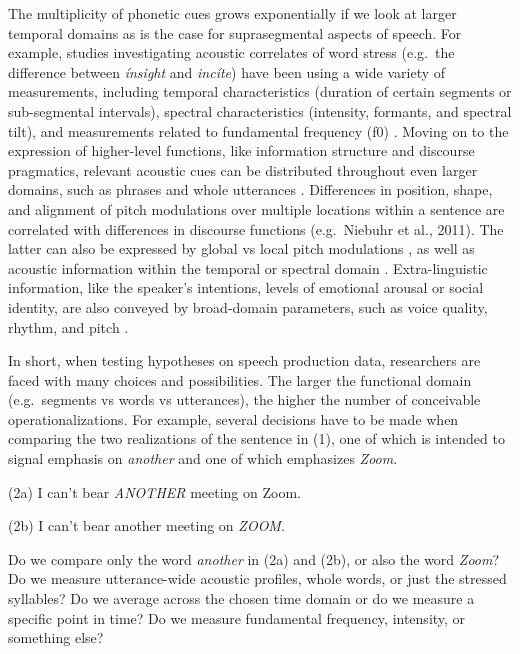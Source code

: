 \documentclass[Review,times,sageh]{sagej}
\begin{document}
The multiplicity of phonetic cues grows exponentially if we look at larger temporal domains as is the case for suprasegmental aspects of speech.
For example, studies investigating acoustic correlates of word stress (e.g.~the difference between \emph{ínsight} and \emph{incíte}) have been using a wide variety of measurements, including temporal characteristics (duration of certain segments or sub-segmental intervals), spectral characteristics (intensity, formants, and spectral tilt), and measurements related to fundamental frequency (f0) \citep[e.g.,][]{gordon2017acoustic}.
Moving on to the expression of higher-level functions, like information structure and discourse pragmatics, relevant acoustic cues can be distributed throughout even larger domains, such as phrases and whole utterances \citep[e.g.,][]{ladd2008intonational}.
Differences in position, shape, and alignment of pitch modulations over multiple locations within a sentence are correlated with differences in discourse functions (e.g.~Niebuhr et al., 2011).
The latter can also be expressed by global vs local pitch modulations \citep{heuven2002}, as well as acoustic information within the temporal or spectral domain \citep[e.g.,][]{van2005speech}.
Extra-linguistic information, like the speaker's intentions, levels of emotional arousal or social identity, are also conveyed by broad-domain parameters, such as voice quality, rhythm, and pitch \citep{foulkes2006, ogden2004, white2009}.

In short, when testing hypotheses on speech production data, researchers are faced with many choices and possibilities.
The larger the functional domain (e.g.~segments vs words vs utterances), the higher the number of conceivable operationalizations.
For example, several decisions have to be made when comparing the two realizations of the sentence in (1), one of which is intended to signal emphasis on \emph{another} and one of which emphasizes \emph{Zoom}.

\vspace{1em}

(2a) I can't bear \emph{ANOTHER} meeting on Zoom.

(2b) I can't bear another meeting on \emph{ZOOM}.

\vspace{1em}

Do we compare only the word \emph{another} in (2a) and (2b), or also the word \emph{Zoom}?
Do we measure utterance-wide acoustic profiles, whole words, or just the stressed syllables?
Do we average across the chosen time domain or do we measure a specific point in time?
Do we measure fundamental frequency, intensity, or something else?
\end{document}
